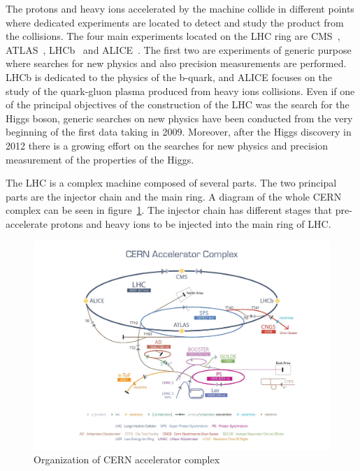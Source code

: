 The protons and heavy ions accelerated by the machine collide in different points where dedicated experiments are located to detect and study the product from the collisions. The four main experiments located on the LHC ring are CMS~\cite{Bayatian:922757,Bayatian:942733}, ATLAS~\cite{ATLAS:1999}, LHCb~\cite{Alves:2008zz} and ALICE~\cite{Cortese:879894}. The first two are experiments of generic purpose where searches for new physics and also precision measurements are performed. LHCb is dedicated to the physics of the b-quark, and ALICE focuses on the study of the quark-gluon plasma produced from heavy ions collisions. Even if one of the principal objectives of the construction of the LHC was the search for the Higgs boson, generic searches on new physics have been conducted from the very beginning of the first data taking in 2009. Moreover, after the Higgs discovery in 2012 there is a growing effort on the searches for new physics and precision measurement of the properties of the Higgs.

The LHC is a complex machine composed of several parts. The two principal parts are the injector chain and the main ring. A diagram of the whole CERN complex can be seen in figure~\ref{fig:Complex}. The injector chain has different stages that pre-accelerate protons and heavy ions to be injected into the main ring of LHC. %

\begin{figure}[!Hhtbp]
  \begin{center}
    \includegraphics[trim=4.5cm 0cm 0cm 0cm, clip=true, width=1.15\textwidth]{figs/cern-lhc-4.jpg}
    \caption{Organization of CERN accelerator complex}
    \label{fig:Complex}
  \end{center}
\end{figure}

